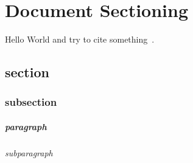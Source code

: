 \chapter{Document Sectioning}
Hello World and try to cite something~\cite{Yang_2016}.

\section{section}
\lipsum[1-2]

\subsection{subsection}
\lipsum[3-4]

\paragraph{paragraph}
\lipsum[5]

\subparagraph{subparagraph}
\lipsum[6]